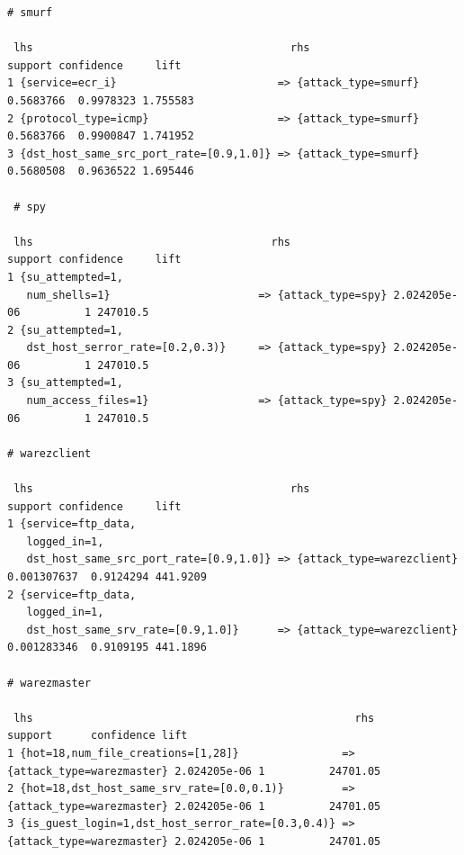 \documentclass[11pt]{article}
\begin{document}
\begin{Verbatim}[fontsize=\tiny]
 # smurf
 
 lhs                                        rhs                   support confidence     lift
1 {service=ecr_i}                         => {attack_type=smurf} 0.5683766  0.9978323 1.755583
2 {protocol_type=icmp}                    => {attack_type=smurf} 0.5683766  0.9900847 1.741952
3 {dst_host_same_src_port_rate=[0.9,1.0]} => {attack_type=smurf} 0.5680508  0.9636522 1.695446
 
 # spy

 lhs                                     rhs                    support confidence     lift
1 {su_attempted=1,                                                                          
   num_shells=1}                       => {attack_type=spy} 2.024205e-06          1 247010.5
2 {su_attempted=1,                                                                          
   dst_host_serror_rate=[0.2,0.3)}     => {attack_type=spy} 2.024205e-06          1 247010.5
3 {su_attempted=1,                                                                          
   num_access_files=1}                 => {attack_type=spy} 2.024205e-06          1 247010.5
 
# warezclient
 
 lhs                                        rhs                           support confidence     lift
1 {service=ftp_data,                                                                                  
   logged_in=1,                                                                                       
   dst_host_same_src_port_rate=[0.9,1.0]} => {attack_type=warezclient} 0.001307637  0.9124294 441.9209
2 {service=ftp_data,                                                                                  
   logged_in=1,                                                                                       
   dst_host_same_srv_rate=[0.9,1.0]}      => {attack_type=warezclient} 0.001283346  0.9109195 441.1896
 
# warezmaster
 
 lhs                                                  rhs                       support      confidence lift    
1 {hot=18,num_file_creations=[1,28]}                => {attack_type=warezmaster} 2.024205e-06 1          24701.05
2 {hot=18,dst_host_same_srv_rate=[0.0,0.1)}         => {attack_type=warezmaster} 2.024205e-06 1          24701.05
3 {is_guest_login=1,dst_host_serror_rate=[0.3,0.4)} => {attack_type=warezmaster} 2.024205e-06 1          24701.05
\end{Verbatim}
\end{document}
